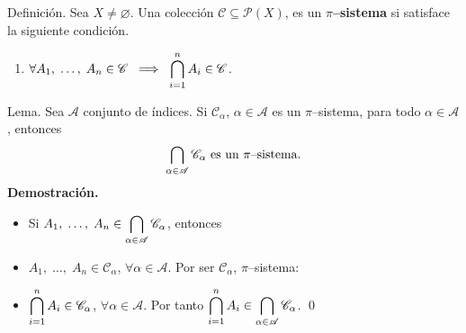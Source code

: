 \documentclass{beamer}
\begin{document}
\begin{frame}[t]
	\begin{block}{Definición.}
		Sea \(X \ne \varnothing\). Una colección \(\mathscr{C} \subseteq \mathscr{P}(X)\), es un \textbf{\(\pi\)--sistema} si satisface la siguiente condición.
		\begin{enumerate}
			\item \(\forall A_1, \;\ldots,\; A_n \in \mathscr{C} \;\implies\; \displaystyle\bigcap_{i=1}^{n} A_i \in \mathscr{C}\).
		\end{enumerate}
	\end{block}
	\begin{block}{Lema.}
		Sea \(\mathscr{A}\) conjunto de índices. Si \(\mathscr{C} _\alpha\), \(\alpha \in \mathscr{A}\) es un \(\pi \)--sistema, para todo \(\alpha \in \mathscr{A}\), entonces
		\[
			\displaystyle\bigcap_{\alpha \in \mathscr{A}} \mathscr{C}_\alpha \mbox{ es un } \pi \mbox{--sistema.}
		\]
		\textbf{Demostración.}
		\begin{itemize}
			\item Si \(A_1, \;\ldots,\; A_n \in \displaystyle\bigcap_{\alpha \in \mathscr{A}} \mathscr{C} _\alpha\), entonces
			\item \(A_1, \;\ldots,\; A_n \in \mathscr{C} _\alpha\), \(\forall \alpha \in \mathscr{A}\). Por ser \(\mathscr{C} _\alpha\), \(\pi\)--sistema:
			\item \(\displaystyle\bigcap_{i=1}^{n} A_i \in \mathscr{C} _\alpha\), \(\forall \alpha \in \mathscr{A}\). Por tanto \(\displaystyle\bigcap_{i=1}^{n} A_i \in \displaystyle\bigcap_{\alpha \in \mathscr{A}} \mathscr{C} _\alpha\). \qed
		\end{itemize}
	\end{block}
\end{frame}

\end{document}
